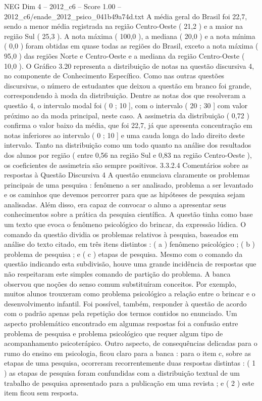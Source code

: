 \begin{textsample}{NEG Dim 4 – 2012\_c6 – Score 1.00 – 2012\_c6/enade\_2012\_psico\_041b49a74d.txt}
A média geral do Brasil foi 22,7, sendo a menor média registrada na região Centro-Oeste ( 21,2 ) e a maior na região Sul ( 25,3 ).
A nota máxima ( 100,0 ), a mediana ( 20,0 ) e a nota mínima ( 0,0 ) foram obtidas em quase todas as regiões do Brasil, exceto a nota máxima ( 95,0 ) das regiões Norte e Centro-Oeste e a mediana da região Centro-Oeste ( 10,0 ).
O Gráfico 3.20 representa a distribuição de notas na questão discursiva 4, no componente de Conhecimento Específico.
Como nas outras questões discursivas, o número de estudantes que deixou a questão em branco foi grande, correspondendo à moda da distribuição.
Dentre as notas dos que resolveram a questão 4, o intervalo modal foi ( 0 ; 10 ], com o intervalo ( 20 ; 30 ] com valor próximo ao da moda principal, neste caso.
A assimetria da distribuição ( 0,72 ) confirma o valor baixo da média, que foi 22,7, já que apresenta concentração em notas inferiores ao intervalo ( 0 ; 10 ] e uma cauda longa do lado direito deste intervalo.
Tanto na distribuição como um todo quanto na análise dos resultados dos alunos por região ( entre 0,56 na região Sul e 0,83 na região Centro-Oeste ), os coeficientes de assimetria são sempre positivos. 3.3.2.4 Comentários sobre as respostas à Questão Discursiva 4 A questão enunciava claramente os problemas principais de uma pesquisa : fenômeno a ser analisado, problema a ser levantado e os caminhos que devemos percorrer para que as hipóteses de pesquisa sejam analisadas.
Além disso, era capaz de convocar o aluno a apresentar seus conhecimentos sobre a prática da pesquisa científica.
A questão tinha como base um texto que evoca o fenômeno psicológico do brincar, da expressão lúdica.
O comando da questão dividia os problemas relativos à pesquisa, baseados em análise do texto citado, em três itens distintos : ( a ) fenômeno psicológico ; ( b ) problema de pesquisa ; e ( c ) etapas de pesquisa.
Mesmo com o comando da questão indicando esta subdivisão, houve uma grande incidência de respostas que não respeitaram este simples comando de partição do problema.
A banca observou que noções do senso comum substituíram conceitos.
Por exemplo, muitos alunos trouxeram como problema psicológico a relação entre o brincar e o desenvolvimento infantil.
Foi possível, também, responder à questão de acordo com o padrão apenas pela repetição dos termos contidos no enunciado.
Um aspecto problemático encontrado em algumas respostas foi a confusão entre problema de pesquisa e problema psicológico que requer algum tipo de acompanhamento psicoterápico.
Outro aspecto, de consequências delicadas para o rumo do ensino em psicologia, ficou claro para a banca : para o item c, sobre as etapas de uma pesquisa, ocorreram recorrentemente duas respostas distintas : ( 1 ) as etapas de pesquisa foram confundidas com a distribuição textual de um trabalho de pesquisa apresentado para a publicação em uma revista ; e ( 2 ) este item ficou sem resposta.

\end{textsample}
